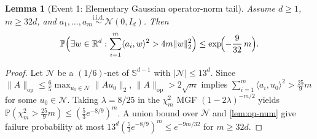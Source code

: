 \documentclass[11pt]{article}
\theoremstyle{plain}
\newtheorem{lemma}[theorem]{Lemma}
\theoremstyle{remark}
\numberwithin{equation}{section}
\newcommand{\R}{\mathbb{R}}
\newcommand{\Prob}{\mathbb{P}}
\newcommand{\Sph}{\mathbb{S}}
\newcommand{\ip}[2]{\langle #1, #2 \rangle}
\newcommand{\norm}[1]{\|#1\|}
\newcommand{\opnorm}[1]{\|#1\|_{\mathrm{op}}}
\begin{document}
\begin{lemma}[Event 1: Elementary Gaussian operator-norm tail]
  \label{lem:op-norm}
  Assume $d \ge 1$, $m \ge 32d$, and $a_1, \dots, a_m \stackrel{\mathrm{i.i.d.}}{\sim} \mathcal{N}(0, I_d)$. Then
  \[
    \Prob\Bigl(\exists w \in \R^d : \sum_{i=1}^m \ip{a_i}{w}^2 > 4m\norm{w}_2^2\Bigr)
    \le \exp\!\Bigl(-\frac{9}{32}\,m\Bigr).
  \]
\end{lemma}
\begin{proof}
Let $\mathcal{N}$ be a $(1/6)$-net of $\Sph^{d-1}$ with $|\mathcal{N}| \le 13^d$. Since $\opnorm{A} \le \frac{6}{5}\max_{u_0 \in \mathcal{N}} \norm{Au_0}_2$, $\opnorm{A} > 2\sqrt{m}$ implies $\sum_{i=1}^m \ip{a_i}{u_0}^2 > \frac{25}{9}m$ for some $u_0 \in \mathcal{N}$. Taking $\lambda = 8/25$ in the $\chi^2_m$ MGF $(1 - 2\lambda)^{-m/2}$ yields $\Prob(\chi^2_m > \frac{25}{9}m) \le (\frac{5}{3}e^{-8/9})^m$. A union bound over $\mathcal{N}$ and \cref{lem:op-num} give failure probability at most $13^d(\frac{5}{3}e^{-8/9})^m \le e^{-9m/32}$ for $m \ge 32d$.
\end{proof}
\end{document}
